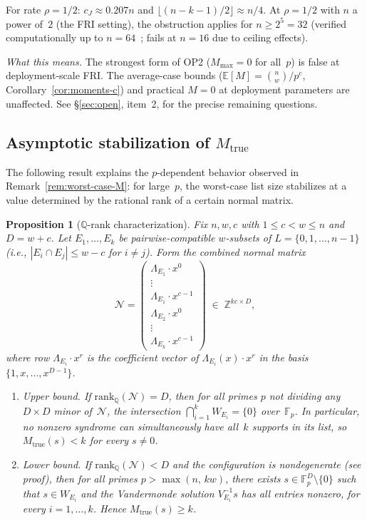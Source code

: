 \documentclass[11pt]{article}
\newtheorem{proposition}[theorem]{Proposition}
\newcommand{\FF}{\mathbb{F}}
\newcommand{\ZZ}{\mathbb{Z}}
\newcommand{\QQ}{\mathbb{Q}}
\newcommand{\EE}{\mathbb{E}}
\begin{document}
For rate $\rho = 1/2$: $c_J \approx 0.207n$ and $\lfloor(n{-}k{-}1)/2\rfloor \approx n/4$. At $\rho = 1/2$ with $n$ a power of~$2$ (the FRI setting), the obstruction applies for $n \geq 2^5 = 32$ (verified computationally up to $n = 64$~\cite{CompanionRepo}; fails at $n = 16$ due to ceiling effects).

\emph{What this means.} The strongest form of OP2 ($M_{\max} = 0$ for all~$p$) is false at deployment-scale FRI. The average-case bounds ($\EE[M] = \binom{n}{w}/p^c$, Corollary~\ref{cor:moments-c}) and practical $M = 0$ at deployment parameters are unaffected. See \S\ref{sec:open}, item~2, for the precise remaining questions.

\subsection{Asymptotic stabilization of $M_{\mathrm{true}}$}
\label{sec:qrank}

The following result explains the $p$-dependent behavior observed in Remark~\ref{rem:worst-case-M}: for large~$p$, the worst-case list size stabilizes at a value determined by the rational rank of a certain normal matrix.

\begin{proposition}[$\QQ$-rank characterization]
\label{prop:qrank}
Fix $n, w, c$ with $1 \leq c < w \leq n$ and $D = w + c$.  Let $E_1, \ldots, E_k$ be pairwise-compatible $w$-subsets of $L = \{0, 1, \ldots, n-1\}$ (i.e., $|E_i \cap E_j| \leq w - c$ for $i \neq j$).  Form the \emph{combined normal matrix}
$$\mathcal{N} = \begin{pmatrix} \Lambda_{E_1} \cdot x^0 \\ \vdots \\ \Lambda_{E_1} \cdot x^{c-1} \\ \hline \Lambda_{E_2} \cdot x^0 \\ \vdots \\ \Lambda_{E_k} \cdot x^{c-1} \end{pmatrix} \;\in\; \ZZ^{kc \times D},$$
where row $\Lambda_{E_i} \cdot x^r$ is the coefficient vector of $\Lambda_{E_i}(x) \cdot x^r$ in the basis $\{1, x, \ldots, x^{D-1}\}$.

\begin{enumerate}[nosep,label=(\alph*)]
\item \emph{Upper bound.}  If $\mathrm{rank}_\QQ(\mathcal{N}) = D$, then for all primes $p$ not dividing any $D \times D$ minor of~$\mathcal{N}$, the intersection $\bigcap_{i=1}^k W_{E_i} = \{0\}$ over~$\FF_p$.  In particular, no nonzero syndrome can simultaneously have all~$k$ supports in its list, so $M_{\mathrm{true}}(s) < k$ for every $s \neq 0$.

\item \emph{Lower bound.}  If $\mathrm{rank}_\QQ(\mathcal{N}) < D$ and the configuration is nondegenerate (see proof), then for all primes $p > \max(n,\, kw)$, there exists $s \in \FF_p^D \setminus \{0\}$ such that $s \in W_{E_i}$ and the Vandermonde solution $V_{E_i}^{-1} s$ has all entries nonzero, for every $i = 1, \ldots, k$.  Hence $M_{\mathrm{true}}(s) \geq k$.
\end{enumerate}
\end{proposition}
\end{document}
